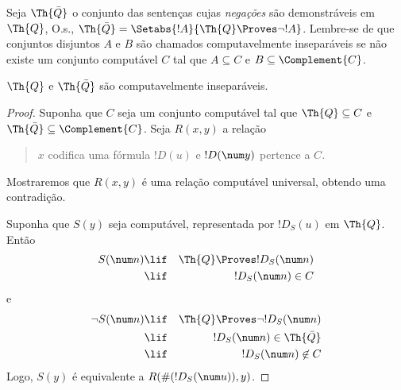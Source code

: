 \documentclass[../../../include/open-logic-section]{subfiles}
\begin{document}



Seja $\Th{\bar Q}$ o conjunto das sentenças cujas {\em negações} são
demonstráveis em $\Th{Q}$, O.s.\@,
$\Th{\bar Q} = \Setabs{!A}{\Th{Q} \Proves \lnot !A}$. Lembre-se de que
conjuntos disjuntos $A$ e $B$ são chamados computavelmente
inseparáveis se não existe um conjunto computável $C$ tal que
$A \subseteq C$ e $B \subseteq \Complement{C}$.

\begin{lem}
$\Th{Q}$ e $\Th{\bar Q}$ são computavelmente inseparáveis.
\end{lem}

\begin{proof}
Suponha que $C$ seja um conjunto computável tal que
$\Th{Q} \subseteq C$ e $\Th{\bar Q} \subseteq \Complement{C}$. Seja
$R(x,y)$ a relação
\begin{quote}
$x$ codifica uma fórmula $!D(u)$ e $!D(\num y)$ pertence a $C$.
\end{quote}
Mostraremos que $R(x,y)$ é uma relação computável universal, obtendo
uma contradição.

Suponha que $S(y)$ seja computável, representada por $!D_S(u)$ em
$\Th{Q}$. Então
\begin{eqnarray*}
S(\num n) & \lif & \Th{Q} \Proves !D_S(\num n) \\
& \lif & !D_S(\num n) \in C
\end{eqnarray*}
e
\begin{eqnarray*}
\lnot S(\num n) & \lif & \Th{Q} \Proves \lnot !D_S(\num n) \\
& \lif & !D_S(\num n) \in \Th{\bar Q} \\
& \lif & !D_S(\num n) \not\in C
\end{eqnarray*}
Logo, $S(y)$ é equivalente a $R(\#(!D_S(\num u)),y)$.
\end{proof}
\end{document}
